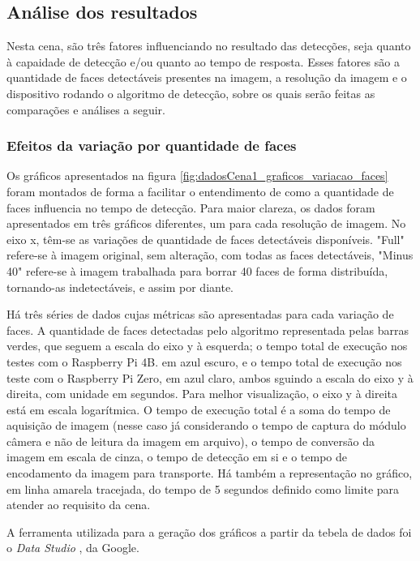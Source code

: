 \subsection{Análise dos resultados}
Nesta cena, são três fatores influenciando no resultado das detecções, seja quanto à capaidade de detecção e/ou quanto ao tempo de resposta. Esses fatores são a quantidade de faces detectáveis presentes na imagem, a resolução da imagem e o dispositivo rodando o algoritmo de detecção, sobre os quais serão feitas as comparações e análises a seguir.

\subsubsection{Efeitos da variação por quantidade de faces}

Os gráficos apresentados na figura \ref{fig:dadosCena1_graficos_variacao_faces} foram montados de forma a facilitar o entendimento de como a quantidade de faces influencia no tempo de detecção. Para maior clareza, os dados foram apresentados em três gráficos diferentes, um para cada resolução de imagem.
No eixo x, têm-se as variações de quantidade de faces detectáveis disponíveis. "Full" refere-se à imagem original, sem alteração, com todas as faces detectáveis, "Minus 40" refere-se à imagem trabalhada para borrar 40 faces de forma distribuída, tornando-as indetectáveis, e assim por diante.

Há três séries de dados cujas métricas são apresentadas para cada variação de faces. A quantidade de faces detectadas pelo algoritmo representada pelas barras verdes, que seguem a escala do eixo y à esquerda; o tempo total de execução nos testes com o Raspberry Pi 4B. em azul escuro, e o tempo total de execução nos teste com o Raspberry Pi Zero, em azul claro, ambos sguindo a escala do eixo y à direita, com unidade em segundos. Para melhor visualização, o eixo y à direita está em escala logarítmica.
O tempo de execução total é a soma do tempo de aquisição de imagem (nesse caso já considerando o tempo de captura do módulo câmera e não de leitura da imagem em arquivo), o tempo de conversão da imagem em escala de cinza, o tempo de detecção em si e o tempo de encodamento da imagem para transporte.
Há também a representação no gráfico, em linha amarela tracejada, do tempo de 5 segundos definido como limite para atender ao requisito da cena.

A ferramenta utilizada para a geração dos gráficos a partir da tebela de dados foi o \emph{Data Studio} \cite{DataStudio}, da Google.

